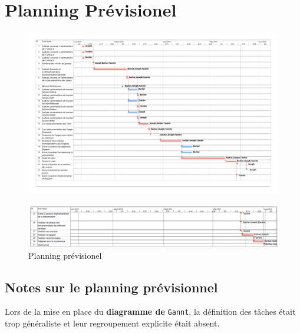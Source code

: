 \documentclass[12pt,a4paper]{report}
\begin{document}
\section{Planning Prévisionel}
\begin{figure}[!ht]
\hspace*{-3.5cm}
\includegraphics[scale=0.48]{pdfs/feuille_de_route.pdf}
\end{figure}

\begin{figure}[!ht]
\hspace*{-3cm}
\includegraphics[scale=0.57]{images/planning_prev_p2.PNG}
\caption{Planning prévisionel}
\end{figure}

\subsection{Notes sur le planning prévisionnel}
Lors de la mise en place du \textbf{diagramme de} \texttt{Gannt}, la définition des tâches était trop généraliste et leur regroupement explicite était absent.

\newpage
\end{document}

